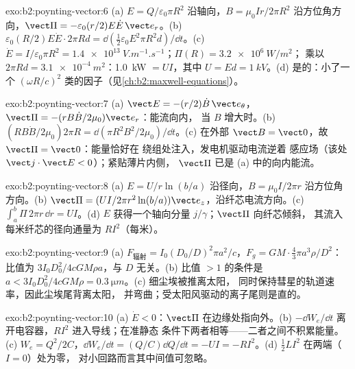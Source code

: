 \begin{solution}{exo:b2:poynting-vector:6}
(a) $E = Q/\varepsilon_0\pi R^2$ 沿轴向，$B = \mu_0Ir/2\pi R^2$ 沿方位角方向，$\vect\Pi = -\varepsilon_0
(r/2)E\dot E\,\vect e_r$。(b) $\varepsilon_0(R/2)E\dot E\cdot2\pi Rd = \dd(\tfrac12\varepsilon_0E^2\pi R^2d)/
\dd t$。(c) $\dot E = I/\varepsilon_0\pi R^2 = \qty{1.4e13}{V.m^{-1}.s^{-1}}$；$\Pi(R) = \qty{3.2e6}{W/m^2}$；
乘以 $2\pi Rd = \qty{3.1e-4}{m^2}$：\qty{1.0}{kW} $= UI$，其中 $U = Ed = \qty{1}{kV}$。(d)
是的：小了一个 $(\omega R/c)^2$ 类的因子（见\cref{ch:b2:maxwell-equations}）。
\end{solution}

\begin{solution}{exo:b2:poynting-vector:7}
(a) $\vect E = -(r/2)\dot B\,\vect e_\theta$，$\vect\Pi = -(rB\dot B/2\mu_0)\vect e_r$：能流向内，
当 $B$ 增大时。(b) $(RB\dot B/2\mu_0)2\pi R = \dd(\pi R^2B^2/2\mu_0)/\dd t$。(c)
在外部 $\vect B = \vect 0$，故 $\vect\Pi = \vect 0$：能量恰好在
绕组处注入，发电机驱动电流逆着
感应场（该处 $\vect j\cdot\vect E < 0$）；紧贴薄片内侧，
$\vect\Pi$ 已是 (a) 中的向内能流。
\end{solution}

\begin{solution}{exo:b2:poynting-vector:8}
(a) $E = U/r\ln(b/a)$ 沿径向，$B = \mu_0I/2\pi r$ 沿方位角方向。(b) $\vect\Pi = (UI/
2\pi r^2\ln(b/a))\vect e_z$，沿纤芯电流方向。(c) $\int_a^b\Pi\,2\pi r\,\dd r =
UI$。(d) $E$ 获得一个轴向分量 $j/\gamma$；$\vect\Pi$ 向纤芯倾斜，
其流入每米纤芯的径向通量为 $RI^2$（每米）。
\end{solution}

\begin{solution}{exo:b2:poynting-vector:9}
(a) $F_{\text{辐射}} = I_0(D_0/D)^2\pi a^2/c$，$F_g = GM\cdot\tfrac43\pi a^3\rho/D^2$：比值为
$3I_0D_0^2/4cGM\rho a$，与 $D$ 无关。(b) 比值 $> 1$ 的条件是 $a < 3I_0D_0^2/
4cGM\rho = \qty{0.3}{\micro m}$。(c) 细尘埃被推离太阳，
同时保持彗星的轨道速率，因此尘埃尾背离太阳，
并弯曲；受太阳风驱动的离子尾则是直的。
\end{solution}

\begin{solution}{exo:b2:poynting-vector:10}
(a) $\dot E < 0$：$\vect\Pi$ 在边缘处指向外。(b) $-\dd W_e/\dd t$
离开电容器，$RI^2$ 进入导线；在准静态
条件下两者相等——二者之间不积累能量。(c) $W_e =
Q^2/2C$，$\dd W_e/\dd t = (Q/C)\dd Q/\dd t = -UI = -RI^2$。(d) $\tfrac12LI^2$
在两端（$I = 0$）处为零，
对小回路而言其中间值可忽略。
\end{solution}

